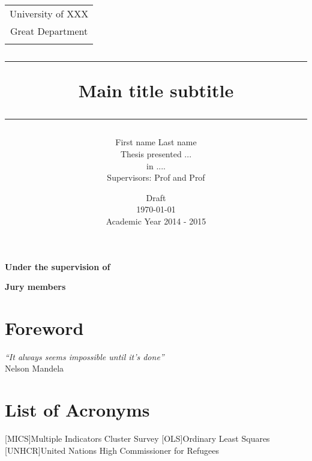 \documentclass[12pt,twoside,openright]{book}
\title{
	\begin{center}
	\vspace{-5cm}
	\begin{figure}[htbp]			
	\begin{center}
	\end{center}
	\end{figure}
	\vspace{1.5cm}
		\begin{tabular}{c}
			\large{University of XXX}\\[-0.2cm]
			\large {Great Department}\\[-0.2cm]
			\vspace{0.2cm}
		\end{tabular}
	\end{center}
\vspace{1.5cm}
{\rule{\linewidth}{0.05cm}}
{\textbf{\LARGE{Main title}}}\linebreak
{\Large subtitle}
{\rule{\linewidth}{0.05cm}}
}
\author{
First name Last name\\[1cm] Thesis presented ...  \\ in .... \\[1cm]
Supervisors: Prof and Prof \\[2cm]
}
\date{Draft \\ \today \\ \vfill Academic Year 2014 - 2015}
\begin{document}
\maketitle

\thispagestyle{empty}
\newpage
\mbox{}

\pagebreak
\thispagestyle{empty}

\begin{center}
\Large \textbf{Under the supervision of} \\[0.5cm]  \large

\end{center}
\vspace{1cm}
\begin{center}
\Large \textbf{Jury members} \\[0.5cm]  \large
\end{center}

\pagebreak

 \setcounter{page}{1} 
\chapter*{Foreword} 

%
\vfill

\pagebreak
%
\thispagestyle{empty}
\mbox{}
\vspace{5cm}
\begin{flushright}
\emph{``It always seems impossible until it's done''}\\[0.2cm]
Nelson Mandela
\end{flushright}
\vfill
\pagebreak


\tableofcontents 

\pagebreak

\listoffigures
{} 
\vfill

\pagebreak

\listoftables
{}
\vfill
 
\pagebreak

\footnotesize
\chapter*{List of Acronyms}
\begin{spacing}{1}
\begin{acronym}
[MICS]{Multiple Indicators Cluster Survey}
[OLS]{Ordinary Least Squares}
[UNHCR]{United Nations High Commissioner for Refugees}
\end{acronym}
\end{spacing}
\vfill
\end{document}

